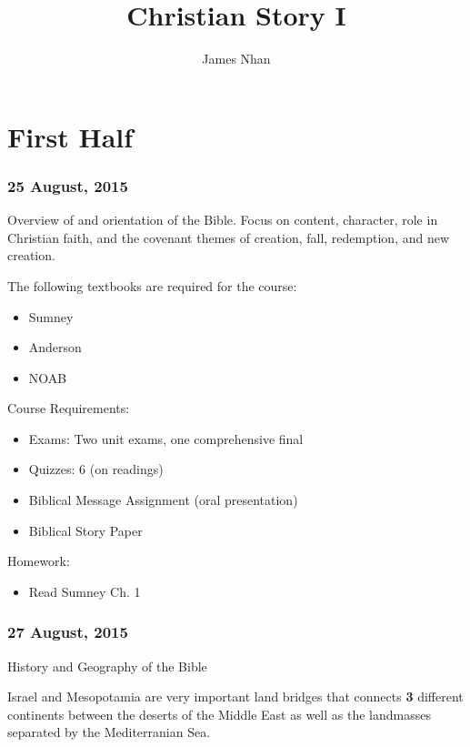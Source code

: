 \documentclass{article}
\title{Christian Story I}
\author{James Nhan}
\date{\longdate{\today}}
\begin{document}
\maketitle

\clearpage
\tableofcontents
\clearpage

\part{First Half}
\section{25 August, 2015}
    Overview of and orientation of the Bible. Focus on content, character, role in Christian faith, and the covenant themes of creation, fall, redemption, and new creation.
    \vspace{10pt}

    \noindent The following textbooks are required for the course:

    \begin{itemize}
        \item Sumney
        \item Anderson
        \item NOAB
    \end{itemize}

    \noindent Course Requirements:

    \begin{itemize}
        \item Exams: Two unit exams, one comprehensive final
        \item Quizzes: 6 (on readings)
        \item Biblical Message Assignment (oral presentation)
        \item Biblical Story Paper
    \end{itemize}

    \noindent Homework:

    \begin{itemize}
        \item Read Sumney Ch. 1
    \end{itemize}

\section{27 August, 2015}
\centerline{History and Geography of the Bible}

    Israel and Mesopotamia are very important land bridges that connects \textbf{3} different continents between the deserts of the Middle East as well as the landmasses separated by the Mediterranian Sea.
\end{document}
